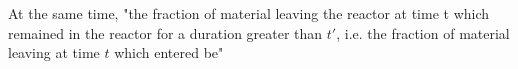 At the same time, "the fraction of material leaving the reactor at time t which remained in the reactor for a duration greater than $t'$, i.e. the fraction of material leaving at time $t$ which entered be"  